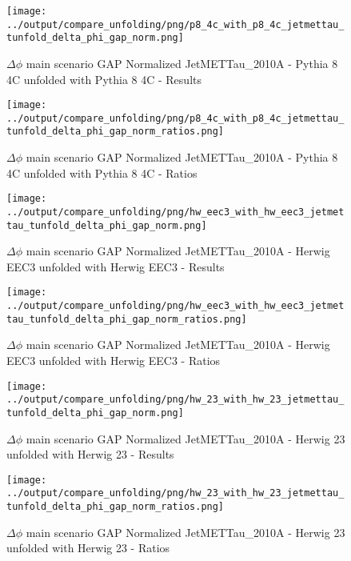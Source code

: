 \documentclass[11pt]{book}
\begin{document}
\begin{figure}[ht]
\centering
\texttt{[image: ../output/compare\_unfolding/png/p8\_4c\_with\_p8\_4c\_jetmettau\_tunfold\_delta\_phi\_gap\_norm.png]}
\caption{$\Delta\phi$ main scenario GAP Normalized JetMETTau\_2010A - Pythia 8 4C unfolded with Pythia 8 4C - Results}
\label{p8_p8_jetmettau_tunfold_delta_phi_gap_norm_a}
\end{figure}

\begin{figure}[ht]
\centering
\texttt{[image: ../output/compare\_unfolding/png/p8\_4c\_with\_p8\_4c\_jetmettau\_tunfold\_delta\_phi\_gap\_norm\_ratios.png]}
\caption{$\Delta\phi$ main scenario GAP Normalized JetMETTau\_2010A - Pythia 8 4C unfolded with Pythia 8 4C - Ratios}
\label{p8_p8_jetmettau_tunfold_delta_phi_gap_norm_b}
\end{figure}

\begin{figure}[ht]
\centering
\texttt{[image: ../output/compare\_unfolding/png/hw\_eec3\_with\_hw\_eec3\_jetmettau\_tunfold\_delta\_phi\_gap\_norm.png]}
\caption{$\Delta\phi$ main scenario GAP Normalized JetMETTau\_2010A - Herwig EEC3 unfolded with Herwig EEC3 - Results}
\label{hw_eec3_hw_eec3_jetmettau_tunfold_delta_phi_gap_norm_a}
\end{figure}

\begin{figure}[ht]
\centering
\texttt{[image: ../output/compare\_unfolding/png/hw\_eec3\_with\_hw\_eec3\_jetmettau\_tunfold\_delta\_phi\_gap\_norm\_ratios.png]}
\caption{$\Delta\phi$ main scenario GAP Normalized JetMETTau\_2010A - Herwig EEC3 unfolded with Herwig EEC3 - Ratios}
\label{hw_eec3_hw_eec3_jetmettau_tunfold_delta_phi_gap_norm_b}
\end{figure}

\begin{figure}[ht]
\centering
\texttt{[image: ../output/compare\_unfolding/png/hw\_23\_with\_hw\_23\_jetmettau\_tunfold\_delta\_phi\_gap\_norm.png]}
\caption{$\Delta\phi$ main scenario GAP Normalized JetMETTau\_2010A - Herwig 23 unfolded with Herwig 23 - Results}
\label{hw_23_hw_23_jetmettau_tunfold_delta_phi_gap_norm_a}
\end{figure}

\begin{figure}[ht]
\centering
\texttt{[image: ../output/compare\_unfolding/png/hw\_23\_with\_hw\_23\_jetmettau\_tunfold\_delta\_phi\_gap\_norm\_ratios.png]}
\caption{$\Delta\phi$ main scenario GAP Normalized JetMETTau\_2010A - Herwig 23 unfolded with Herwig 23 - Ratios}
\label{hw_23_hw_23_jetmettau_tunfold_delta_phi_gap_norm_b}
\end{figure}
\end{document}
